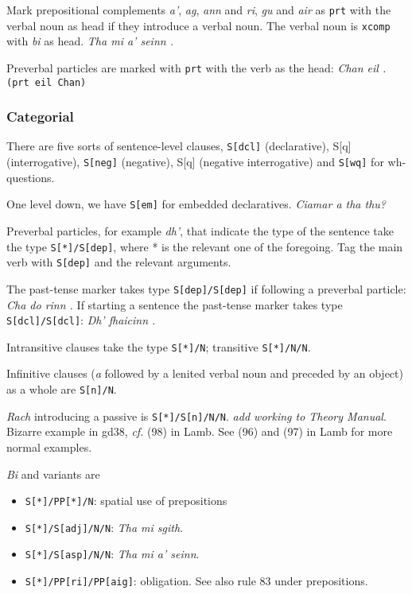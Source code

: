 \documentclass[a4paper]{article}
\begin{document}
 Mark prepositional complements \textit{a'}, \textit{ag}, \textit{ann} and \textit{ri}, \textit{gu} and \textit{air} as \texttt{prt} with the verbal noun as head if they introduce a verbal noun. The verbal noun is \texttt{xcomp} with \textit{bi} as head. \textit{Tha mi a' seinn .}

 Preverbal particles are marked with \texttt{prt} with the verb as the head: \textit{Chan eil .} \texttt{(prt eil Chan)} 

\subsubsection{Categorial}
 There are five sorts of sentence-level clauses, \texttt{S[dcl]} (declarative), S[q] (interrogative), \texttt{S[neg]} (negative), S[q] (negative interrogative) and \texttt{S[wq]} for wh-questions.

 One level down, we have \texttt{S[em]} for embedded declaratives. \textit{Ciamar a tha thu?}

 Preverbal particles, for example \textit{dh'}, that indicate the type of the sentence take the type \texttt{S[*]/S[dep]}, where * is the relevant one of the foregoing. Tag the main verb with \texttt{S[dep]} and the relevant arguments.

 The past-tense marker takes type \texttt{S[dep]/S[dep]} if following a preverbal particle: \textit{Cha do rinn .}
If starting a sentence the past-tense marker takes type \texttt{S[dcl]/S[dcl]}: \textit{Dh' fhaicinn .}

 Intransitive clauses take the type \texttt{S[*]/N}; transitive \texttt{S[*]/N/N}.

 Infinitive clauses (\textit{a} followed by a lenited verbal noun and preceded by an object) as a whole are \texttt{S[n]/N}.

 \textit{Rach} introducing a passive is \texttt{S[*]/S[n]/N/N}. \textit{add working to Theory Manual}. Bizarre example in gd38, \textit{cf.} (98) in Lamb. See (96) and (97) in Lamb for more normal examples.

 \textit{Bi} and variants are \begin{itemize}
\item \texttt{S[*]/PP[*]/N}: spatial use of prepositions 
\item \texttt{S[*]/S[adj]/N/N}: \textit{Tha mi sgith}.
\item \texttt{S[*]/S[asp]/N/N}: \textit{Tha mi a' seinn}.
\item \texttt{S[*]/PP[ri]/PP[aig]}: obligation. See also rule 83 under prepositions.
\end{itemize}
\end{document}
